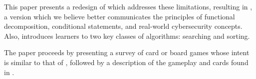 This paper presents a redesign of \gameName which addresses these limitations, resulting in \pwTwoNS, a version which we believe better communicates the principles of functional decomposition, conditional statements, and real-world cybersecurity concepts. Also, \pwTwo introduces learners to two key classes of algorithms: searching and sorting.

The paper proceeds by presenting a survey of card or board games whose intent is similar to that of \gameName, followed by a description of the gameplay and cards found in \pwTwoNS.
